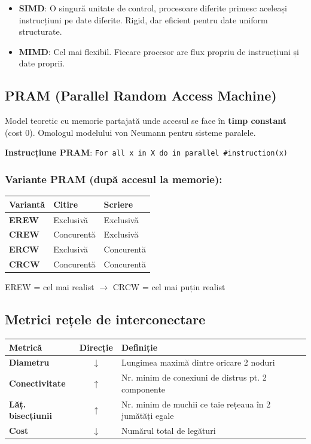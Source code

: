 \documentclass[a4paper,11pt]{article}
\newcommand{\thead}[1]{\cellcolor{tblheader}\color{white}\textbf{#1}}
\begin{document}
\begin{itemize}[noitemsep]
  \item \textbf{SIMD}: O singură unitate de control, procesoare diferite primesc aceleași instrucțiuni pe date diferite. Rigid, dar eficient pentru date uniform structurate.
  \item \textbf{MIMD}: Cel mai flexibil. Fiecare procesor are flux propriu de instrucțiuni și date proprii.
\end{itemize}

\subsection{PRAM (Parallel Random Access Machine)}

Model teoretic cu memorie partajată unde accesul se face în \textbf{timp constant} (cost 0). Omologul modelului von Neumann pentru sisteme paralele.

\textbf{Instrucțiune PRAM}: \lstinline|For all x in X do in parallel #instruction(x)|

\subsubsection{Variante PRAM (după accesul la memorie):}

\begin{center}
\begin{tabular}{lll}
\toprule
\thead{Variantă} & \thead{Citire} & \thead{Scriere} \\
\midrule
\textbf{EREW} & Exclusivă & Exclusivă \\
\textbf{CREW} & Concurentă & Exclusivă \\
\textbf{ERCW} & Exclusivă & Concurentă \\
\textbf{CRCW} & Concurentă & Concurentă \\
\bottomrule
\end{tabular}
\end{center}

EREW = cel mai realist \quad $\longrightarrow$ \quad CRCW = cel mai puțin realist

\subsection{Metrici rețele de interconectare}

\begin{center}
\begin{tabular}{lcp{7cm}}
\toprule
\thead{Metrică} & \thead{Direcție} & \thead{Definiție} \\
\midrule
\textbf{Diametru} & $\downarrow$ & Lungimea maximă dintre oricare 2 noduri \\
\textbf{Conectivitate} & $\uparrow$ & Nr. minim de conexiuni de distrus pt. 2 componente \\
\textbf{Lăț. bisecțiunii} & $\uparrow$ & Nr. minim de muchii ce taie rețeaua în 2 jumătăți egale \\
\textbf{Cost} & $\downarrow$ & Numărul total de legături \\
\bottomrule
\end{tabular}
\end{center}
\end{document}
